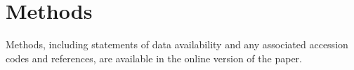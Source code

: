 \documentclass[8pt, twocolumn]{article}
\newcommand{\cel}{\emph{C.~elegans}}
\newcommand{\ecol}{\emph{E.~coli}}
\newcommand{\gene}[1]{\mbox{\emph{#1}}}
\begin{document}
\section*{Methods}
\label{sec:methods}
Methods, including statements of data availability and any associated
accession codes and references, are available in the online version of
the paper.

%
%
%
\end{document}
